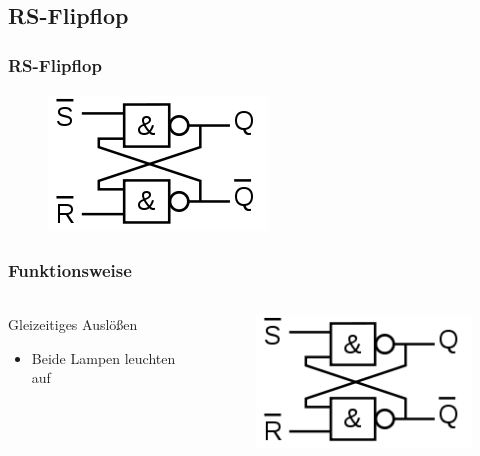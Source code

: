 \subsection{RS-Flipflop} %
\label{sub:RS-Flipflop}
\begin{frame}
    \frametitle{RS-Flipflop}
    \framesubtitle{}
    \begin{figure}[H]
    \begin{center}
            \includegraphics[scale=0.5]{./img/schaltung/RS-FF.png}
    \end{center}
    \end{figure}
\end{frame}
\begin{frame}
    \frametitle{Funktionsweise}
    \framesubtitle{}
    \begin{columns}[c]
            \begin{block}{Gleizeitiges Auslößen}
                \begin{itemize}
                    \item Beide Lampen leuchten auf 
                \end{itemize}
            \end{block}
            \begin{figure}[H]
            \begin{center}
                    \includegraphics[scale=0.5]{./img/schaltung/RS-FF.png}
            \end{center}
            \end{figure}
    \end{columns}
\end{frame}
